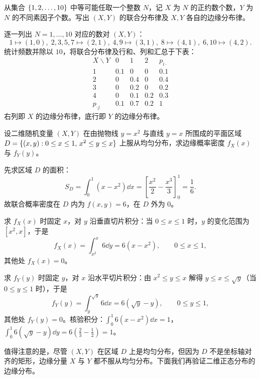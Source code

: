 \begin{example}[title={正约数个数与不同素因子个数的联合与边缘分布}]
\label{eg:divisor-prime-joint}
从集合 $\{1,2,\ldots,10\}$ 中等可能任取一个整数 $N$，记 $X$ 为 $N$ 的正约数个数，$Y$ 为 $N$ 的不同素因子个数。写出 $(X,Y)$ 的联合分布律及 $X,Y$ 各自的边缘分布律。
\begin{solution}
逐一列出 $N=1,\ldots,10$ 对应的数对 $(X,Y)$：
\[
  1\mapsto(1,0),\;2,3,5,7\mapsto(2,1),\;4,9\mapsto(3,1),\;
  8\mapsto(4,1),\;6,10\mapsto(4,2).
\]
统计频数并除以 $10$，将联合分布律及行和、列和汇总于下表：
\[
\begin{array}{c|ccc|c}
  X\backslash Y & 0 & 1 & 2 & p_{i\cdot} \\ \hline
  1 & 0.1 & 0 & 0 & 0.1 \\
  2 & 0 & 0.4 & 0 & 0.4 \\
  3 & 0 & 0.2 & 0 & 0.2 \\
  4 & 0 & 0.1 & 0.2 & 0.3 \\ \hline
  p_{\cdot j} & 0.1 & 0.7 & 0.2 & 1
\end{array}
\]
右列即 $X$ 的边缘分布律，底行即 $Y$ 的边缘分布律。
\end{solution}
\end{example}

\begin{example}[title={曲边区域上均匀分布的边缘密度}]
\label{eg:curved-support-marginal}
设二维随机变量 $(X,Y)$ 在由抛物线 $y=x^2$ 与直线 $y=x$ 所围成的平面区域 $D=\{(x,y):0\le x\le 1,\,x^2\le y\le x\}$ 上服从均匀分布，求边缘概率密度 $f_X(x)$ 与 $f_Y(y)$。
\begin{solution}
先求区域 $D$ 的面积：
\[
  S_D=\int_{0}^{1}(x-x^2)\dd x=\left[\frac{x^2}{2}-\frac{x^3}{3}\right]_{0}^{1}=\frac{1}{6}.
\]
故联合概率密度在 $D$ 内为 $f(x,y)=6$，在 $D$ 外为 $0$。

求 $f_X(x)$ 时固定 $x$，对 $y$ 沿垂直切片积分：当 $0\le x\le 1$ 时，$y$ 的变化范围为 $[x^2,x]$，于是
\[
  f_X(x)=\int_{x^2}^{x}6\dd y=6(x-x^2),\qquad 0\le x\le 1,
\]
其他处 $f_X(x)=0$。

求 $f_Y(y)$ 时固定 $y$，对 $x$ 沿水平切片积分：由 $x^2\le y\le x$ 解得 $y\le x\le\sqrt{y}$（当 $0\le y\le 1$ 时），于是
\[
  f_Y(y)=\int_{y}^{\sqrt{y}}6\dd x=6(\sqrt{y}-y),\qquad 0\le y\le 1,
\]
其他处 $f_Y(y)=0$。核验积分：$\int_{0}^{1}6(x-x^2)\dd x=1$，$\int_{0}^{1}6(\sqrt{y}-y)\dd y=6(\frac{2}{3}-\frac{1}{2})=1$。
\end{solution}
\end{example}

值得注意的是，尽管 $(X,Y)$ 在区域 $D$ 上是均匀分布，但因为 $D$ 不是坐标轴对齐的矩形，边缘分量 $X$ 与 $Y$ 都不服从均匀分布。下面我们再验证二维正态分布的边缘分布。

